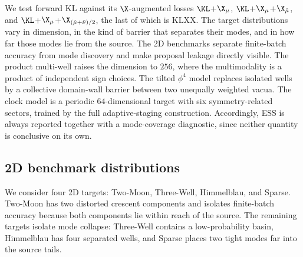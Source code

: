 \documentclass{article}
\begin{document}
We test forward KL against its $\X$-augmented losses $\KL$+$\X_\mu$, $\KL$+$\X_\mu$+$\X_{\hat\mu}$, and $\KL$+$\X_\mu$+$\X_{(\hat\mu+\bar\nu)/2}$, the last of which is KLXX. The target distributions vary in dimension, in the kind of barrier that separates their modes, and in how far those modes lie from the source. The 2D benchmarks separate finite-batch accuracy from mode discovery and make proposal leakage directly visible. The product multi-well raises the dimension to $256$, where the multimodality is a product of independent sign choices. The tilted $\phi^4$ model replaces isolated wells by a collective domain-wall barrier between two unequally weighted vacua. The clock model is a periodic $64$-dimensional target with six symmetry-related sectors, trained by the full adaptive-staging construction. Accordingly, ESS is always reported together with a mode-coverage diagnostic, since neither quantity is conclusive on its own.

\subsection{2D benchmark distributions}
\label{subsec: 2d-benchmark}

We consider four 2D targets: Two-Moon, Three-Well, Himmelblau, and Sparse. Two-Moon has two distorted crescent components and isolates finite-batch accuracy because both components lie within reach of the source. The remaining targets isolate mode collapse: Three-Well contains a low-probability basin, Himmelblau has four separated wells, and Sparse places two tight modes far into the source tails.
\end{document}
